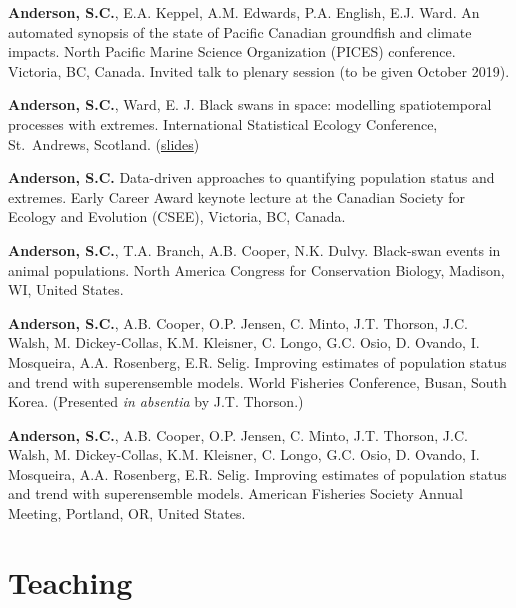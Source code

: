\begin{description}
\tightlist
\item[2019]
\textbf{Anderson, S.C.}, E.A. Keppel, A.M. Edwards, P.A. English, E.J.
Ward. An automated synopsis of the state of Pacific Canadian groundfish
and climate impacts. North Pacific Marine Science Organization (PICES)
conference. Victoria, BC, Canada. Invited talk to plenary session (to be
given October 2019).
\item[2018]
\textbf{Anderson, S.C.}, Ward, E. J. Black swans in space: modelling
spatiotemporal processes with extremes. International Statistical
Ecology Conference, St.\ Andrews, Scotland.
(\href{https://www.dropbox.com/s/ufce52ocpycftk1/anderson-ward-isec-2018.pdf?dl=1}{slides})
\item[2017]
\textbf{Anderson, S.C.} Data-driven approaches to quantifying population
status and extremes. Early Career Award keynote lecture at the Canadian
Society for Ecology and Evolution (CSEE), Victoria, BC, Canada.
\item[2016]
\textbf{Anderson, S.C.}, T.A. Branch, A.B. Cooper, N.K. Dulvy.
Black-swan events in animal populations. North America Congress for
Conservation Biology, Madison, WI, United States.
\item[2016]
\textbf{Anderson, S.C.}, A.B. Cooper, O.P. Jensen, C. Minto, J.T.
Thorson, J.C. Walsh, M. Dickey-Collas, K.M. Kleisner, C. Longo, G.C.
Osio, D. Ovando, I. Mosqueira, A.A. Rosenberg, E.R. Selig. Improving
estimates of population status and trend with superensemble models.
World Fisheries Conference, Busan, South Korea. (Presented \emph{in
absentia} by J.T. Thorson.)
\item[2015]
\textbf{Anderson, S.C.}, A.B. Cooper, O.P. Jensen, C. Minto, J.T.
Thorson, J.C. Walsh, M. Dickey-Collas, K.M. Kleisner, C. Longo, G.C.
Osio, D. Ovando, I. Mosqueira, A.A. Rosenberg, E.R. Selig. Improving
estimates of population status and trend with superensemble models.
American Fisheries Society Annual Meeting, Portland, OR, United States.
\end{description}

\hypertarget{teaching}{%
\section{Teaching}\label{teaching}}

